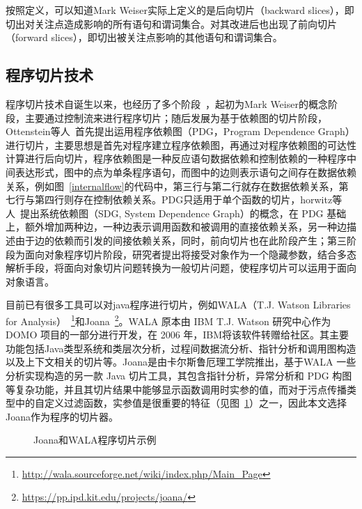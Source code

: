 按照定义，可以知道Mark Weiser实际上定义的是后向切片（backward slices），即切出对关注点造成影响的所有语句和谓词集合。对其改进后也出现了前向切片（forward slices），即切出被关注点影响的其他语句和谓词集合。

\subsection{程序切片技术}
程序切片技术自诞生以来，也经历了多个阶段~\cite{slices:xu2005brief}，起初为Mark Weiser的概念阶段，主要通过控制流来进行程序切片；随后发展为基于依赖图的切片阶段，Ottenstein等人~\cite{slices:ottenstein1984program}首先提出运用程序依赖图（PDG，Program Dependence Graph）进行切片，主要思想是首先对程序建立程序依赖图，再通过对程序依赖图的可达性计算进行后向切片，程序依赖图是一种反应语句数据依赖和控制依赖的一种程序中间表达形式，图中的点为单条程序语句，而图中的边则表示语句之间存在数据依赖关系，例如图~\ref{internalflow}的代码中，第三行与第二行就存在数据依赖关系，第七行与第四行则存在控制依赖关系。PDG只适用于单个函数的切片，horwitz等人~\cite{slices:horwitz1990}提出系统依赖图（SDG, System Dependence Graph）的概念，在 PDG 基础上，额外增加两种边，一种边表示调用函数和被调用的直接依赖关系，另一种边描述由于边的依赖而引发的间接依赖关系，同时，前向切片也在此阶段产生；第三阶段为面向对象程序切片阶段，研究者提出将接受对象作为一个隐藏参数，结合多态解析手段，将面向对象切片问题转换为一般切片问题，使程序切片可以运用于面向对象语言。

目前已有很多工具可以对java程序进行切片，例如WALA（T.J. Watson Libraries for Analysis）~\footnote{\url{http://wala.sourceforge.net/wiki/index.php/Main_Page}}和Joana~\footnote{\url{https://pp.ipd.kit.edu/projects/joana/}}。WALA 原本由 IBM T.J. Watson 研究中心作为 DOMO 项目的一部分进行开发，在 2006 年，IBM将该软件转赠给社区。其主要功能包括Java类型系统和类层次分析，过程间数据流分析、指针分析和调用图构造以及上下文相关的切片等。Joana是由卡尔斯鲁厄理工学院推出，基于WALA 一些分析实现构造的另一款 Java 切片工具，其包含指针分析，异常分析和 PDG 构图等复杂功能，并且其切片结果中能够显示函数调用时实参的值，而对于污点传播类型中的自定义过滤函数，实参值是很重要的特征（见图~\ref{fig:sliceresult}）之一，因此本文选择Joana作为程序的切片器。
\begin{figure}[!htbp]
	\centering
	\caption{Joana和WALA程序切片示例}
	\label{fig:sliceresult} %
\end{figure}

